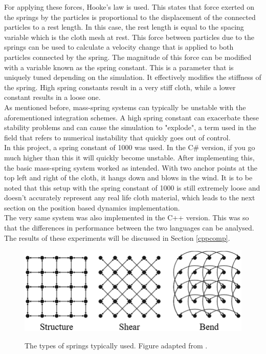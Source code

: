 \documentclass[12pt,a4paper]{article}
\begin{document}
For applying these forces, Hooke's law is used. This states that force exerted on the springs by the particles is proportional to the displacement of the connected particles to a rest length. In this case, the rest length is equal to the spacing variable which is the cloth mesh at rest. This force between particles due to the springs can be used to calculate a velocity change that is applied to both particles connected by the spring. The magnitude of this force can be modified with a variable known as the spring constant. This is a parameter that is uniquely tuned depending on the simulation. It effectively modifies the stiffness of the spring. High spring constants result in a very stiff cloth, while a lower constant results in a loose one. \\
As mentioned before, mass-spring systems can typically be unstable with the aforementioned integration schemes. A high spring constant can exacerbate these stability problems and can cause the simulation to "explode", a term used in the field that refers to numerical instability that quickly goes out of control. \\

In this project, a spring constant of 1000 was used. In the C\# version, if you go much higher than this it will quickly become unstable. After implementing this, the basic mass-spring system worked as intended. With two anchor points at the top left and right of the cloth, it hangs down and blows in the wind. It is to be noted that this setup with the spring constant of 1000 is still extremely loose and doesn't accurately represent any real life cloth material, which leads to the next section on the position based dynamics implementation. \\

The very same system was also implemented in the C++ version. This was so that the differences in performance between the two languages can be analysed. The results of these experiments will be discussed in Section \ref{cppcomp}.

\begin{figure}
	\centering
	\caption{The types of springs typically used. Figure adapted from \protect\cite{springs}.}
	\includegraphics[scale=0.5]{springs.png}
	\label{fig:mss}
\end{figure}
\end{document}
